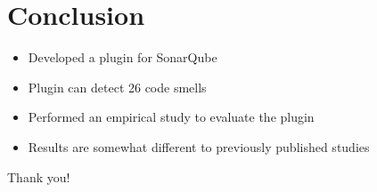 \documentclass{beamer}
\begin{document}
    \section{Conclusion}\label{sec:conclusion}
    \begin{frame}{\secname}
        \begin{itemize}
            \item Developed a plugin for SonarQube
            \item Plugin can detect 26 code smells
            \item Performed an empirical study to evaluate the plugin
            \item Results are somewhat different to previously published studies
        \end{itemize}
    \end{frame}

    \begin{frame}[standout]
        Thank you!
    \end{frame}
\end{document}
